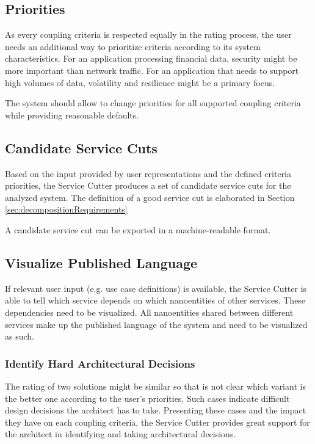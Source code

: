 \subsection{Priorities}

As every coupling criteria is respected equally in the rating process, the user needs an additional way to prioritize criteria according to its system characteristics. For an application processing financial data, security might be more important than network traffic. For an application that needs to support high volumes of data, volatility and resilience might be a primary focus.

The system should allow to change priorities for all supported coupling criteria while providing reasonable defaults. 

\subsection{Candidate Service Cuts}

Based on the input provided by user representations and the defined criteria priorities, the Service Cutter produces a set of candidate service cuts for the analyzed system. The definition of a good service cut is elaborated in Section \ref{sec:decompositionRequirements}

A candidate service cut can be exported in a machine-readable format.

\subsection{Visualize Published Language}

If relevant user input (e.g. use case definitions) is available, the Service Cutter is able to tell which service depends on which nanoentities of other services. These dependencies need to be visualized. All nanoentities shared between different services make up the published language of the system and need to be visualized as such.

\subsubsection{Identify Hard Architectural Decisions}
\label{subsec:identifyHardADs}

The rating of two solutions might be similar so that is not clear which variant is the better one according to the user's priorities. Such cases indicate difficult design decisions the architect has to take. Presenting these cases and the impact they have on each coupling criteria, the Service Cutter provides great support for the architect in identifying and taking architectural decisions.

